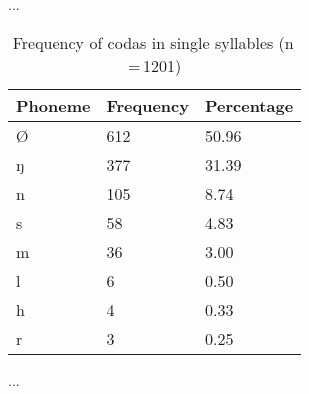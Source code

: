 ...

\begin{table}[pth]\centering
\caption[Frequency of codas in single syllables]{Frequency of codas in single syllables (n\,=\,1201)}
\begin{tabu} to 0.5\textwidth{X X[c] X[c]}
\tableheaderfont\toprule
Phoneme
	& Frequency
	& Percentage
	\\
	
\toprule

Ø
	& 612
	& 50.96\pct\\

\midrule

ŋ
	& 377
	& 31.39\pct\\
n
	& 105
	& 8.74\pct\\
s
	& 58
	& 4.83\pct\\
m
	& 36
	& 3.00\pct\\
l
	& 6
	& 0.50\pct\\
h
	& 4
	& 0.33\pct\\
r
	& 3
	& 0.25\pct\\

\bottomrule
\end{tabu}
\label{tab:singcod}
\end{table}

...

